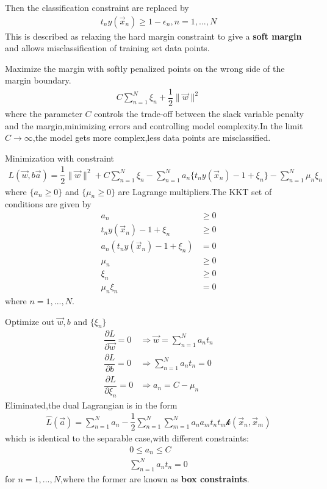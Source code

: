 Then the classification constraint are replaced by
\begin{align}
t_n y(\vec{x}_n) \geq 1-\epsilon_n,n=1,...,N
\end{align}
This is described as relaxing the hard margin constraint to give a \textbf{soft margin} and allows misclassification of training set data points.

Maximize the margin with softly penalized points on the wrong side of the margin boundary.
\begin{align}
C\sum_{n=1}^{N}\xi_n +\dfrac{1}{2}\parallel\vec{w}\parallel^2
\end{align}
where the parameter $C$ controls the trade-off between the slack variable penalty and the margin,minimizing errors and controlling model complexity.In the limit $C\longrightarrow \infty$,the model gets more complex,less data points are misclassified.

Minimization with constraint
\begin{align}
L(\vec{w},b\vec{a}) =\dfrac{1}{2}\parallel\vec{w}\parallel^2+C\sum_{n=1}^{N}\xi_n-\sum_{n=1}^{N}a_n\{t_n y(\vec{x}_n)-1+\xi_n \} -\sum_{n=1}^{N}\mu_n\xi_n
\end{align}
where $\{a_n\geq 0\}$ and $\{\mu_n \geq 0 \}$ are Lagrange multipliers.The KKT set of conditions are given by
\begin{align}
a_n &\geq 0 \\
t_n y(\vec{x}_n)-1+\xi_n &\geq 0 \\
a_n(t_n y(\vec{x}_n)-1+\xi_n) &= 0 \\
\mu_n &\geq 0 \\
\xi_n &\geq 0 \\
\mu_n\xi_n &=0
\end{align}
where $n=1,...,N$.

Optimize out $\vec{w},b$ and $\{\xi_n\}$
\begin{align}
\dfrac{\partial L}{\partial\vec{w}} =0 &\Rightarrow \vec{w}=\sum_{n=1}^{N}a_n t_n \\ 
\dfrac{\partial L}{\partial b}=0 &\Rightarrow \sum_{n=1}^{N}a_n t_n =0 \\
\dfrac{\partial L}{\partial \xi_n} =0 &\Rightarrow a_n = C-\mu_n
\end{align}
Eliminated,the dual Lagrangian is in the form
\begin{align}\label{eqn:SVM Lagrangian}
\hat{L}(\vec{a}) = \sum_{n=1}^{N}a_n -\dfrac{1}{2}\sum_{n=1}^{N}\sum_{m=1}^{N}a_n a_m t_n t_m \mathcal{k}(\vec{x}_n,\vec{x}_m)
\end{align}
which is identical to the separable case,with different constraints:
\begin{align}
0\leq a_n \leq C\\
\sum_{n=1}^{N}a_n t_n = 0
\end{align}
for $n=1,...,N$,where the former are known as \textbf{box constraints}.

